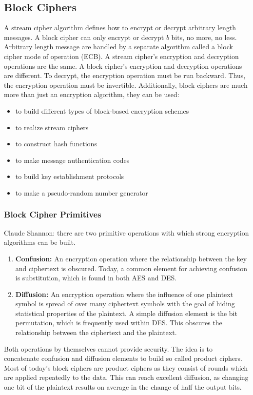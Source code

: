 \documentclass{math}
\begin{document}
\subsection*{Block Ciphers}
A stream cipher algorithm defines how to encrypt or decrypt arbitrary length
messages. A block cipher can only encrypt or decrypt \( b \) bits, no more, no
less. Arbitrary length message are handled by a separate algorithm called a
block cipher mode of operation (ECB). A stream cipher's encryption and
decryption operations are the same. A block cipher's encryption and decryption
operations are different. To decrypt, the encryption operation must be run
backward. Thus, the encryption operation must be invertible. Additionally, block
ciphers are much more than just an encryption algorithm, they can be used:
\begin{itemize}
  \item to build different types of block-based encryption schemes
  \item to realize stream ciphers
  \item to construct hash functions
  \item to make message authentication codes
  \item to build key establishment protocols
  \item to make a pseudo-random number generator
\end{itemize}

\subsubsection*{Block Cipher Primitives}
Claude Shannon: there are two primitive operations with which strong encryption
algorithms can be built.
\begin{enumerate}
  \item \textbf{Confusion:} An encryption operation where the relationship
  between the key and ciphertext is obscured. Today, a common element for
  achieving confusion is substitution, which is found in both AES and DES.
  \item \textbf{Diffusion:} An encryption operation where the influence of one
  plaintext symbol is spread of over many ciphertext symbols with the goal of
  hiding statistical properties of the plaintext. A simple diffusion element is
  the bit permutation, which is frequently used within DES. This obscures the
  relationship between the ciphertext and the plaintext.
\end{enumerate}
Both operations by themselves cannot provide security. The idea is to
concatenate confusion and diffusion elements to build so called product ciphers.
Most of today's block ciphers are product ciphers as they consist of rounds
which are applied repeatedly to the data. This can reach excellent diffusion, as
changing one bit of the plaintext results on average in the change of half the
output bits.
\end{document}
